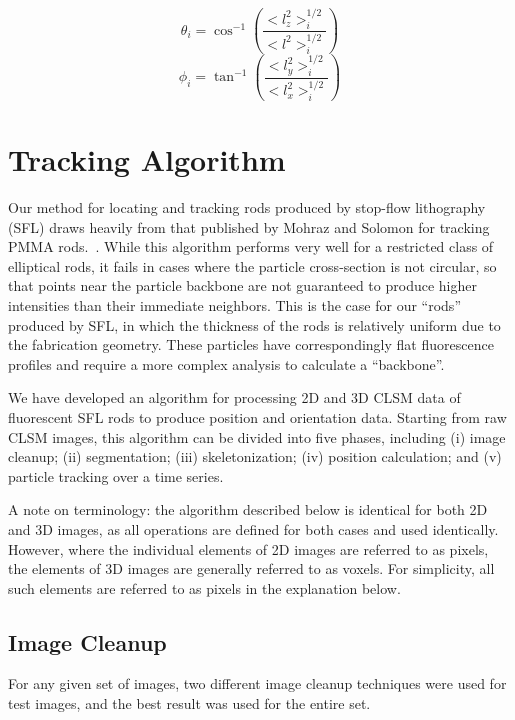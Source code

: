 \begin{equation}
\label{eq:theta}
\theta_i = \cos^{-1} \left(\frac{<l_z^2>_i^{1/2}}{<l^2>_i^{1/2}} \right)
\end{equation}
\begin{equation}
\label{eq:phi}
\phi_i = \tan^{-1} \left(\frac{<l_y^2>_i^{1/2}}{<l_x^2>_i^{1/2}} \right)
\end{equation}

\section{Tracking Algorithm}
\label{sec:rod-tracking}

Our method for locating and tracking rods produced by stop-flow lithography (SFL) draws heavily from that published by 
Mohraz and Solomon for tracking PMMA rods.~\cite{rods-mohraz}.
While this algorithm performs very well for a restricted class of 
elliptical rods, it fails in cases where the particle
cross-section is not circular, so that points near the particle backbone are not guaranteed to produce higher 
intensities than their immediate neighbors.  This is the case for our ``rods'' produced by SFL,
 in which the thickness of the rods is relatively uniform due to the fabrication
geometry. These particles have correspondingly flat fluorescence profiles and require a more complex analysis
to calculate a ``backbone''.

We have developed an algorithm for processing 2D and 3D CLSM data of fluorescent SFL rods to
produce position and orientation data.  Starting from raw CLSM images, this algorithm can be divided
into five phases, including (i) image cleanup; (ii) segmentation; (iii) skeletonization;
(iv) position calculation; and
(v) particle tracking over a time series.  

A note on terminology: the algorithm described below is identical for both 2D and 3D images, as all
operations are defined for both cases and used identically. However, where the individual elements of
2D images are referred to as pixels, the elements of 3D images are generally referred to as voxels.
For simplicity, all such elements are referred to as pixels in the explanation below.

\subsection{Image Cleanup}

For any given set of images, two different image cleanup techniques were used for test
images, and the best result was used for the entire set.

